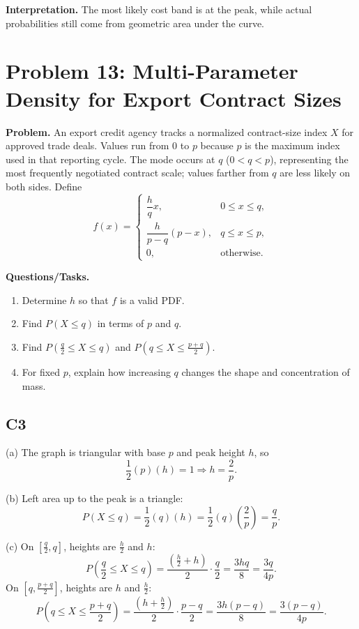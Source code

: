 \textbf{Interpretation.}
The most likely cost band is at the peak, while actual probabilities still come from geometric area under the curve.

\section{Problem 13: Multi-Parameter Density for Export Contract Sizes}

\textbf{Problem.}
An export credit agency tracks a normalized contract-size index $X$ for approved trade deals. Values run from $0$ to $p$ because $p$ is the maximum index used in that reporting cycle. The mode occurs at $q$ ($0<q<p$), representing the most frequently negotiated contract scale; values farther from $q$ are less likely on both sides. Define
\[
f(x)=\begin{cases}
\dfrac{h}{q}x, & 0\le x\le q,\\
\dfrac{h}{p-q}(p-x), & q\le x\le p,\\
0, & \text{otherwise.}
\end{cases}
\]

\textbf{Questions/Tasks.}
\begin{enumerate}[label=(\alph*)]
\item Determine $h$ so that $f$ is a valid PDF.
\item Find $P(X\le q)$ in terms of $p$ and $q$.
\item Find $P\!\left(\frac q2\le X\le q\right)$ and $P\!\left(q\le X\le\frac{p+q}{2}\right)$.
\item For fixed $p$, explain how increasing $q$ changes the shape and concentration of mass.
\end{enumerate}

\subsection*{C3}
(a) The graph is triangular with base $p$ and peak height $h$, so
\[
\frac12(p)(h)=1\Rightarrow h=\frac{2}{p}.
\]

(b) Left area up to the peak is a triangle:
\[
P(X\le q)=\frac12(q)(h)=\frac12(q)\left(\frac{2}{p}\right)=\frac{q}{p}.
\]

(c) On $\left[\frac q2,q\right]$, heights are $\frac h2$ and $h$:
\[
P\!\left(\frac q2\le X\le q\right)=\frac{\left(\frac h2+h\right)}{2}\cdot\frac q2=\frac{3hq}{8}=\frac{3q}{4p}.
\]
On $\left[q,\frac{p+q}{2}\right]$, heights are $h$ and $\frac h2$:
\[
P\!\left(q\le X\le\frac{p+q}{2}\right)=\frac{\left(h+\frac h2\right)}{2}\cdot\frac{p-q}{2}=\frac{3h(p-q)}{8}=\frac{3(p-q)}{4p}.
\]

